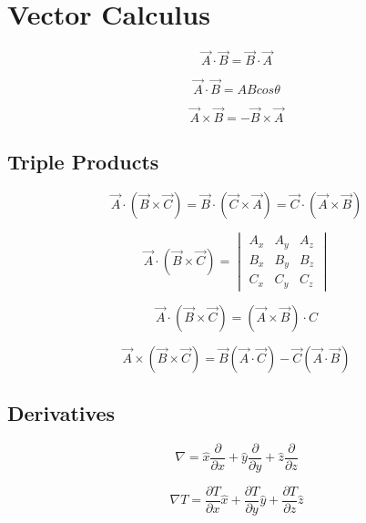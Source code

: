 \chapter{Vector Calculus}
\begin{equation}
	\vec A \cdot \vec B = \vec B \cdot \vec A
\end{equation}

\begin{equation}
	\vec A \cdot \vec B  = A B cos \theta
\end{equation}

\begin{equation}
	\vec A \times \vec B = -\vec B \times \vec A
\end{equation}

\section{Triple Products}
\begin{equation}
	\vec A \cdot (\vec B \times \vec C) = \vec B \cdot (\vec C \times \vec A) = \vec C \cdot (\vec A \times \vec B)
\end{equation}

\begin{equation}
	\vec A \cdot (\vec B \times \vec C) = \begin{vmatrix} 
	A_x&A_y&A_z\\
	B_x&B_y&B_z\\
	C_x&C_y&C_z 
	\end{vmatrix}
\end{equation}

\begin{equation}
	\vec A \cdot (\vec B \times \vec C) = (\vec A \times \vec B) \cdot C
\end{equation}

\begin{equation}
	\vec A \times (\vec B \times \vec C) = \vec B(\vec A \cdot \vec C) - \vec C(\vec A \cdot \vec B)
\end{equation}

\section{Derivatives}
\begin{equation}
	\nabla  =  \hat{x} \frac{\partial }{\partial x} +  \hat{y} \frac{\partial }{\partial y} + \hat{z} \frac{\partial }{\partial z} 
\end{equation}

\begin{equation}
	\nabla T = \frac{\partial T}{\partial x} \hat{x} + \frac{\partial T}{\partial y} \hat{y} + \frac{\partial T}{\partial z} \hat{z}
\end{equation}

